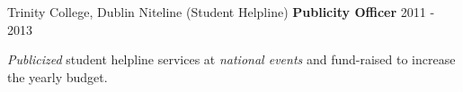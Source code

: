 \begin{cventries}
  \cventry
  	{Trinity College, Dublin}
  	{Niteline (Student Helpline)} %
    {\textbf{Publicity Officer}} %
    {2011 - 2013} %
    {
      \begin{cvitems} %
        \item {\textit{Publicized} student helpline services at \textit{national events} and fund-raised to increase the yearly budget.}
      \end{cvitems}
    }
    
\end{cventries}
    

